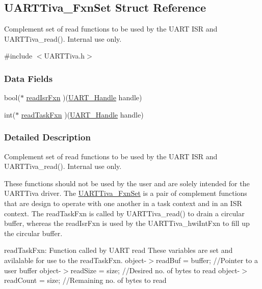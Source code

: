 \subsection{U\+A\+R\+T\+Tiva\+\_\+\+Fxn\+Set Struct Reference}
\label{struct_u_a_r_t_tiva___fxn_set}


Complement set of read functions to be used by the U\+A\+R\+T I\+S\+R and U\+A\+R\+T\+Tiva\+\_\+read(). Internal use only.  




{\ttfamily \#include $<$U\+A\+R\+T\+Tiva.\+h$>$}

\subsubsection*{Data Fields}
\begin{DoxyCompactItemize}
\item 
bool($\ast$ \hyperlink{struct_u_a_r_t_tiva___fxn_set_ad66c0a54b44d0644b62d423d9509f00b}{read\+Isr\+Fxn} )(\hyperlink{_u_a_r_t_8h_a13cc669fae768d8212e6491ce71b28af}{U\+A\+R\+T\+\_\+\+Handle} handle)
\item 
int($\ast$ \hyperlink{struct_u_a_r_t_tiva___fxn_set_a2d8d82ae7ddead58689077955772c5fa}{read\+Task\+Fxn} )(\hyperlink{_u_a_r_t_8h_a13cc669fae768d8212e6491ce71b28af}{U\+A\+R\+T\+\_\+\+Handle} handle)
\end{DoxyCompactItemize}


\subsubsection{Detailed Description}
Complement set of read functions to be used by the U\+A\+R\+T I\+S\+R and U\+A\+R\+T\+Tiva\+\_\+read(). Internal use only. 

These functions should not be used by the user and are solely intended for the U\+A\+R\+T\+Tiva driver. The \hyperlink{struct_u_a_r_t_tiva___fxn_set}{U\+A\+R\+T\+Tiva\+\_\+\+Fxn\+Set} is a pair of complement functions that are design to operate with one another in a task context and in an I\+S\+R context. The read\+Task\+Fxn is called by U\+A\+R\+T\+Tiva\+\_\+read() to drain a circular buffer, whereas the read\+Isr\+Fxn is used by the U\+A\+R\+T\+Tiva\+\_\+hwi\+Int\+Fxn to fill up the circular buffer.

read\+Task\+Fxn\+: Function called by U\+A\+R\+T read These variables are set and avilalable for use to the read\+Task\+Fxn. object-\/$>$read\+Buf = buffer; //\+Pointer to a user buffer object-\/$>$read\+Size = size; //\+Desired no. of bytes to read object-\/$>$read\+Count = size; //\+Remaining no. of bytes to read

